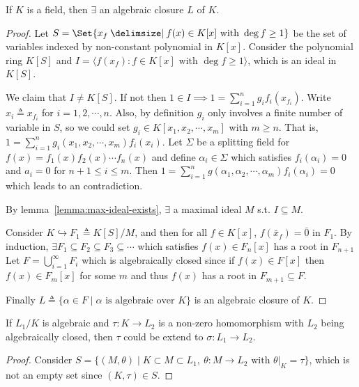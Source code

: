 \begin{theorem}
  If $K$ is a field, then $\exists$ an algebraic closure $L$ of $K$.

  \begin{proof}
    Let $S = \Set{x_f \given f(x) \in K[x] \text{ with } \deg f \geq 1}$ be the set of variables indexed by non-constant
    polynomial in $K[x]$. Consider the polynomial ring $K[S]$ and $I = \langle f(x_f) : f \in K[x] \text{ with } \deg f \geq 1 \rangle$,
    which is an ideal in $K[S]$.

    We claim that $I \neq K[S]$. If not then $1 \in I \implies 1 = \sum_{i = 1}^n g_i f_i(x_{f_i})$.
    Write $x_i \triangleq x_{f_i}$ for $i = 1, 2, \cdots, n$. Also, by definition $g_i$ only involves a finite number of
    variable in $S$, so we could set $g_i \in K[x_1, x_2, \cdots, x_m]$ with $m \geq n$. That is, $1 = \sum_{i = 1}^n g_i(x_1, x_2,
    \cdots, x_m) f_i(x_i)$. Let $\Sigma$ be a splitting field for $f(x) = f_1(x) f_2(x) \cdots f_n(x)$ and define $\alpha_i \in \Sigma$
    which satisfies $f_i(\alpha_i) = 0$ and $a_i = 0$ for $n+1 \leq i \leq m$. Then
    $1 = \sum_{i = 1}^n g(\alpha_1, \alpha_2, \cdots, \alpha_m) f_i(\alpha_i) = 0$ which leads to an contradiction.

    By lemma~\ref{lemma:max-ideal-exists}, $\exists$ a maximal ideal $M$ s.t. $I \subseteq M$.

    Consider $K \hookrightarrow F_1 \triangleq K[S] / M$, and then for all $f \in K[x]$, $f(\bar{x}_f) = \bar{0}$ in $F_1$.
    By induction, $\exists F_1 \subseteq F_2 \subseteq F_3 \subseteq \cdots$
    which satisfies $f(x) \in F_n[x]$ has a root in $F_{n+1}$
    Let $F = \bigcup_{i = 1}^\infty F_i$ which is algebraically closed since if $f(x) \in F[x]$ then $f(x) \in F_m[x]$
    for some $m$ and thus $f(x)$ has a root in $F_{m+1} \subseteq F$.

    Finally $L \triangleq \{ \alpha \in F \mid \alpha \text{ is algebraic over } K \}$ is an algebraic closure of $K$.
  \end{proof}

  \begin{lemma} \label{lemma:homo-extend-to-alg-closed-extension}
    If $L_1 / K$ is algebraic and $\tau: K \to L_2$ is a non-zero homomorphism with $L_2$ being algebraically closed,
    then $\tau$ could be extend to $\sigma: L_1 \to L_2$.

    \begin{proof}
      Consider $S = \{ (M, \theta) \mid K \subset M \subset L_1,\ \theta: M \to L_2 \text{ with } \theta\big|_K = \tau\}$,
      which is not an empty set since $(K, \tau) \in S$.


\end{proof}
\end{lemma}
\end{theorem}
